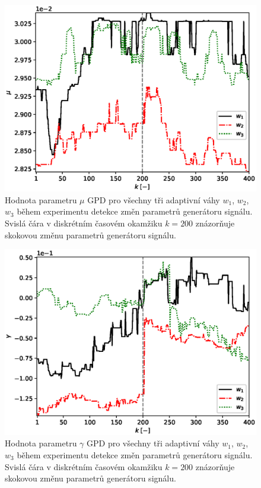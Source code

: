 \begin{figure}[h!]

	\centering
	\includegraphics[scale=0.71]{IMG/appel_par/par_mu.eps}
	\caption{Hodnota parametru $\mu$ GPD pro všechny tři adaptivní váhy $w_1$, $w_2$, $w_3$ během experimentu detekce změn parametrů generátoru signálu. Svislá čára v diskrétním časovém okamžiku $k=200$ znázorňuje skokovou změnu parametrů generátoru signálu.}
		\label{fig:par_mu}
\end{figure}

\begin{figure}[h!]

	\centering
	\includegraphics[scale=0.71]{IMG/appel_par/par_gamma.eps}
	\caption{Hodnota parametru $\gamma$ GPD pro všechny tři adaptivní váhy $w_1$, $w_2$, $w_3$ během experimentu detekce změn parametrů generátoru signálu. Svislá čára v diskrétním časovém okamžiku $k=200$ znázorňuje skokovou změnu parametrů generátoru signálu.}
		\label{fig:par_gamma}
\end{figure}

